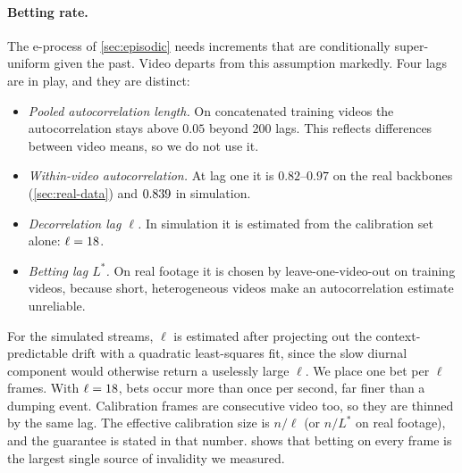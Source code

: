 \paragraph{Betting rate.}
The e-process of \cref{sec:episodic} needs increments that are conditionally super-uniform given the past. Video departs from this assumption markedly. Four lags are in play, and they are distinct:
\begin{itemize}
\item \emph{Pooled autocorrelation length.} On concatenated training videos the autocorrelation stays above $0.05$ beyond 200 lags. This reflects differences between video means, so we do not use it.
\item \emph{Within-video autocorrelation.} At lag one it is $0.82$--$0.97$ on the real backbones (\cref{sec:real-data}) and $0.839$ in simulation.
\item \emph{Decorrelation lag $\ell$.} In simulation it is estimated from the calibration set alone: $\ell = 18$.
\item \emph{Betting lag $L^\ast$.} On real footage it is chosen by leave-one-video-out on training videos, because short, heterogeneous videos make an autocorrelation estimate unreliable.
\end{itemize}
For the simulated streams, $\ell$ is estimated after projecting out the context-predictable drift with a quadratic least-squares fit, since the slow diurnal component would otherwise return a uselessly large $\ell$. We place one bet per $\ell$ frames. With $\ell = 18$, bets occur more than once per second, far finer than a dumping event. Calibration frames are consecutive video too, so they are thinned by the same lag. The effective calibration size is $n/\ell$ (or $n/L^\ast$ on real footage), and the guarantee is stated in that number.  shows that betting on every frame is the largest single source of invalidity we measured.

